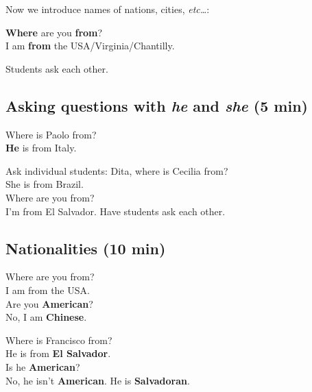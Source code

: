 Now we introduce names of nations, cities, \emph{etc\ldots}:
\begin{framed}
\dialt \textbf{Where} are you \textbf{from}?\\
\hspace{0em}\phantom \dialt I am \textbf{from} the USA/Virginia/Chantilly.
\end{framed}

Students ask each other.

\subsection{Asking questions with \emph{he} and \emph{she} (5 min)}
\begin{framed}
\dialt Where is Paolo from?\\
\hspace{0em}\phantom \dialt \textbf{He} is from Italy.
\end{framed}
Ask individual students:
\ex
\dialt Dita, where is Cecilia from?\\
\dials She is from Brazil.\\
\dialt Where are you from?\\
\dials I'm from El Salvador.
\xe
Have students ask each other.

\subsection{Nationalities (10 min)}
\begin{framed}
\dialt Where are you from?\\
\hspace{0em}\phantom \dialt I am from the USA.\\
\hspace{0em}\phantom \dialt Are you \textbf{American}?\\
\hspace{0em}\phantom \dialt No, I am \textbf{Chinese}.\\
\end{framed}
\begin{framed}
\dialt Where is Francisco from?\\
\hspace{0em}\phantom \dialt He is from \textbf{El Salvador}.\\
\hspace{0em}\phantom \dialt Is he \textbf{American}?\\
\hspace{0em}\phantom \dialt No, he isn't \textbf{American}. He is \textbf{Salvadoran}.
\end{framed}


